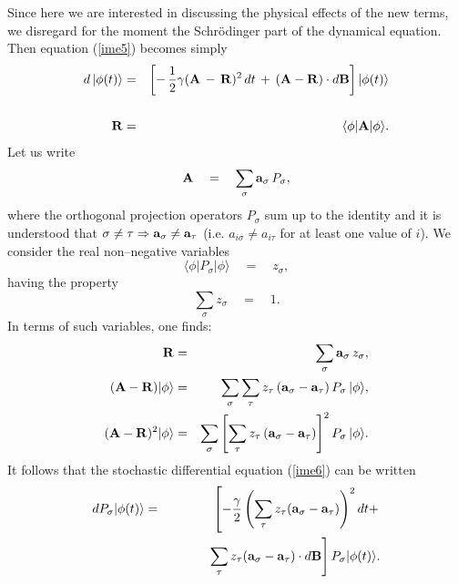 \documentclass[10pt,a4paper]{article}
\begin{document}
Since here we are interested in discussing the physical effects of
the new terms, we disregard for the moment the Schr\"odinger part
of the dynamical equation. Then equation (\ref{ime5}) becomes
simply
\begin{eqnarray} \label{ime6}
d\, |\phi(t)\rangle & = & \left[ -\,\frac{1}{2}\gamma ({\bf
A}\,-\, {\bf R})^{2}\, dt  \, + \, ( {\bf A} - {\bf R})\cdot d{\bf
B} \right]
|\phi(t)\rangle  \\
& & \nonumber \\
{\bf R} & = &  \langle \phi|{\bf A}|\phi \rangle. \nonumber
\end{eqnarray}
Let us write
\begin{equation} \label{sra}
{\bf A} \quad = \quad \sum_{\sigma} {\bf a}_{\sigma}\,P_{\sigma},
\end{equation}
where the orthogonal projection operators $P_{\sigma}$ sum up to
the identity and it is understood that $\sigma \neq \tau
\Rightarrow {\bf a}_{\sigma} \neq {\bf a}_{\tau}$ (i.e.
$a_{i\sigma} \neq a_{i\tau}$ for at least one value of $i$). We
consider the real non--negative variables
\begin{equation}
\langle \phi|P_{\sigma}|\phi \rangle \quad = \quad z_{\sigma},
\end{equation}
having the property
\begin{equation}
\sum_{\sigma} z_{\sigma} \quad = \quad 1.
\end{equation}
In terms of such variables, one finds:
\begin{eqnarray}
{\bf R} & = & \sum_{\sigma} {\bf a}_{\sigma}\, z_{\sigma}, \\
({\bf A} - {\bf R})|\phi\rangle & = & \sum_{\sigma} \sum_{\tau}
z_{\tau}\, ({\bf a}_{\sigma} - {\bf a}_{\tau})\, P_{\sigma}\,
|\phi\rangle,
\\
({\bf A} - {\bf R})^{2}|\phi\rangle & = & \sum_{\sigma} \left[
\sum_{\tau} z_{\tau}\, ({\bf a}_{\sigma} - {\bf
a}_{\tau})\right]^{2} P_{\sigma}\, |\phi\rangle.
\end{eqnarray}
It follows that the stochastic differential equation (\ref{ime6})
can be written
\begin{eqnarray} \label{ime7}
d P_{\sigma}|\phi(t)\rangle & = & \left[- \frac{\gamma}{2} \left(
\sum_{\tau} z_{\tau}({\bf a}_{\sigma} - {\bf a}_{\tau})\right)^{2}
dt + \right.
\nonumber \\
& & \qquad\quad \left. \sum_{\tau}z_{\tau}({\bf a}_{\sigma} - {\bf
a}_{\tau})\cdot d{\bf B} \right] P_{\sigma} |\phi(t)\rangle.
\end{eqnarray}
\end{document}
